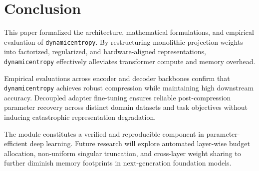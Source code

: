 \section{Conclusion}
This paper formalized the architecture, mathematical formulations, and empirical evaluation of \texttt{dynamicentropy}. By restructuring monolithic projection weights into factorized, regularized, and hardware-aligned representations, \texttt{dynamicentropy} effectively alleviates transformer compute and memory overhead.

Empirical evaluations across encoder and decoder backbones confirm that \texttt{dynamicentropy} achieves robust compression while maintaining high downstream accuracy. Decoupled adapter fine-tuning ensures reliable post-compression parameter recovery across distinct domain datasets and task objectives without inducing catastrophic representation degradation.

The module constitutes a verified and reproducible component in parameter-efficient deep learning. Future research will explore automated layer-wise budget allocation, non-uniform singular truncation, and cross-layer weight sharing to further diminish memory footprints in next-generation foundation models.
